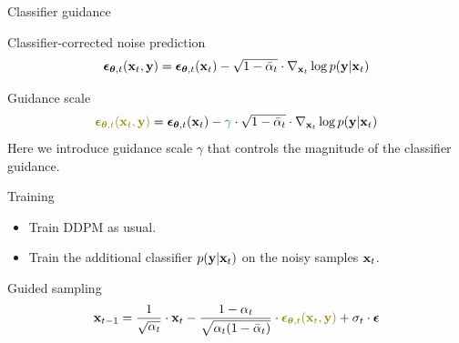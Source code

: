 \begin{frame}{Classifier guidance}
	\begin{block}{Classifier-corrected noise prediction}
		\vspace{-0.3cm}
		\[
			\boldsymbol{\epsilon}_{\boldsymbol{\theta}, t}(\mathbf{x}_t, \mathbf{y}) = \boldsymbol{\epsilon}_{\boldsymbol{\theta}, t}(\mathbf{x}_t) - \sqrt{1 - \bar{\alpha}_t} \cdot \nabla_{\mathbf{x}_t} \log p(\mathbf{y} | \mathbf{x}_t)
		\]
		\vspace{-0.5cm}
	\end{block}
	\begin{block}{Guidance scale}
		\vspace{-0.3cm}
		\[
			{\color{olive}\bepsilon_{\btheta, t}(\bx_t, \by)} = \bepsilon_{\btheta, t}(\bx_t) - {\color{teal}\gamma} \cdot \sqrt{1 - \bar{\alpha}_t} \cdot \nabla_{\bx_t} \log p(\by | \bx_t)
		\]
		Here we introduce {\color{teal} guidance scale $\gamma$} that controls the magnitude of the classifier guidance.
	\end{block}
	\begin{block}{Training}
		\begin{itemize}
			\item Train DDPM as usual.
			\item Train the additional classifier $p(\mathbf{y} | \mathbf{x}_t)$ on the noisy samples $\mathbf{x}_t$.
		\end{itemize}
		\vspace{-0.2cm}
	\end{block}
	\begin{block}{Guided sampling}
		\vspace{-0.3cm}
		\[
			\bx_{t-1} = \frac{1}{\sqrt{\alpha_t}} \cdot \bx_t - \frac{1 - \alpha_t}{\sqrt{\alpha_t (1 - \bar{\alpha}_t)}} \cdot  {\color{olive}\bepsilon_{\btheta, t}(\bx_t, \by)} + \sigma_t \cdot \bepsilon
		\]
	\end{block}
\end{frame}
